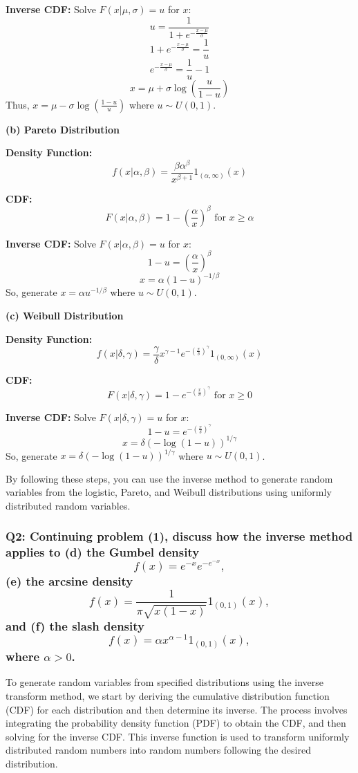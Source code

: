 \documentclass[8pt]{article}
\begin{document}
\textbf{Inverse CDF:}
Solve \( F(x|\mu, \sigma) = u \) for \( x \):
\[
u = \frac{1}{1 + e^{-\frac{x-\mu}{\sigma}}}
\]
\[
1 + e^{-\frac{x-\mu}{\sigma}} = \frac{1}{u}
\]
\[
e^{-\frac{x-\mu}{\sigma}} = \frac{1}{u} - 1
\]
\[
x = \mu + \sigma \log\left(\frac{u}{1-u}\right)
\]
Thus, \( x = \mu - \sigma \log\left(\frac{1-u}{u}\right) \) where \( u \sim U(0, 1) \).

\textbf{(b) Pareto Distribution}

\textbf{Density Function:}
\[
f(x|\alpha, \beta) = \frac{\beta \alpha^\beta}{x^{\beta+1}} 1_{(\alpha, \infty)}(x)
\]

\textbf{CDF:}
\[
F(x|\alpha, \beta) = 1 - \left(\frac{\alpha}{x}\right)^\beta \text{ for } x \geq \alpha
\]

\textbf{Inverse CDF:}
Solve \( F(x|\alpha, \beta) = u \) for \( x \):
\[
1 - u = \left(\frac{\alpha}{x}\right)^\beta
\]
\[
x = \alpha (1 - u)^{-1/\beta}
\]
So, generate \( x = \alpha u^{-1/\beta} \) where \( u \sim U(0, 1) \).

\textbf{(c) Weibull Distribution}

\textbf{Density Function:}
\[
f(x|\delta, \gamma) = \frac{\gamma}{\delta} x^{\gamma-1} e^{-\left(\frac{x}{\delta}\right)^\gamma} 1_{(0, \infty)}(x)
\]

\textbf{CDF:}
\[
F(x|\delta, \gamma) = 1 - e^{-\left(\frac{x}{\delta}\right)^\gamma} \text{ for } x \geq 0
\]

\textbf{Inverse CDF:}
Solve \( F(x|\delta, \gamma) = u \) for \( x \):
\[
1 - u = e^{-\left(\frac{x}{\delta}\right)^\gamma}
\]
\[
x = \delta \left(-\log(1-u)\right)^{1/\gamma}
\]
So, generate \( x = \delta (-\log(1-u))^{1/\gamma} \) where \( u \sim U(0, 1) \).

By following these steps, you can use the inverse method to generate random variables from the logistic, Pareto, and Weibull distributions using uniformly distributed random variables.

\subsubsection*{Q2:
Continuing problem (1), discuss how the inverse method applies to (d) the Gumbel density
\[
f(x) = e^{-x} e^{-e^{-x}},
\]
(e) the arcsine density
\[
f(x) = \frac{1}{\pi \sqrt{x(1-x)}} 1_{(0,1)}(x),
\]
and (f) the slash density
\[
f(x) = \alpha x^{\alpha-1} 1_{(0,1)}(x),
\]
where \(\alpha > 0\).}

To generate random variables from specified distributions using the inverse transform method, we start by deriving the cumulative distribution function (CDF) for each distribution and then determine its inverse. The process involves integrating the probability density function (PDF) to obtain the CDF, and then solving for the inverse CDF. This inverse function is used to transform uniformly distributed random numbers into random numbers following the desired distribution.
\end{document}
